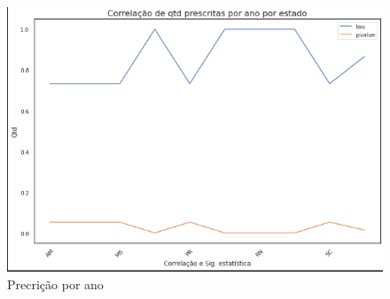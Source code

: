     \begin{figure}[!ht]
        \centering
        \includegraphics[width=0.8\linewidth]{04-figuras/corelaticao_estados.png}
        \caption{Precrição por ano}
        \label{fig:tau}
    \end{figure}

